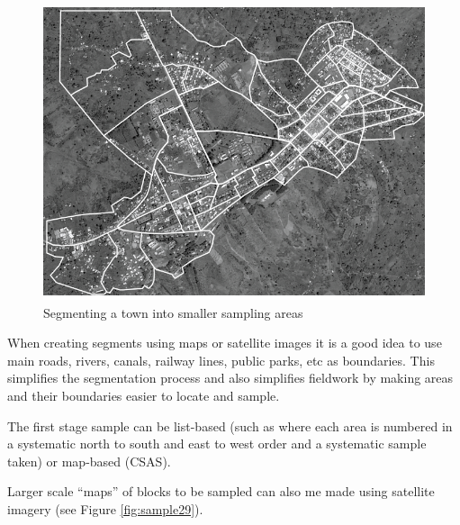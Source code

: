\documentclass[12pt,a4paper]{book}
\theoremstyle{definition}
\theoremstyle{definition}
\theoremstyle{definition}
\theoremstyle{remark}
\begin{document}
\begin{figure}[H]

{\centering \includegraphics{figures/stage2sample14} 

}

\caption{Segmenting a town into smaller sampling areas}\label{fig:sample28}
\end{figure}

When creating segments using maps or satellite images it is a good idea
to use main roads, rivers, canals, railway lines, public parks, etc as
boundaries. This simplifies the segmentation process and also simplifies
fieldwork by making areas and their boundaries easier to locate and
sample.

The first stage sample can be list-based (such as where each area is
numbered in a systematic north to south and east to west order and a
systematic sample taken) or map-based (CSAS).

Larger scale ``maps'' of blocks to be sampled can also me made using
satellite imagery (see Figure \ref{fig:sample29}).

\newpage
\end{document}
